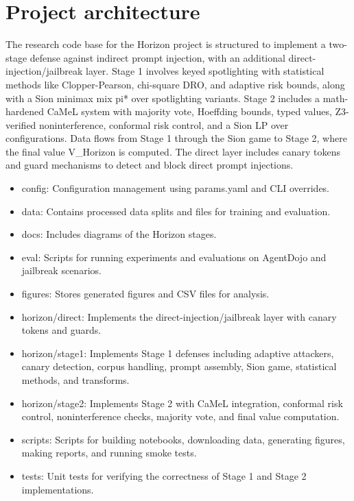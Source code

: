 \documentclass[11pt,a4paper]{article}
\begin{document}
\section{Project architecture}
The research code base for the Horizon project is structured to implement a two-stage defense against indirect prompt injection, with an additional direct-injection/jailbreak layer. Stage 1 involves keyed spotlighting with statistical methods like Clopper-Pearson, chi-square DRO, and adaptive risk bounds, along with a Sion minimax mix pi* over spotlighting variants. Stage 2 includes a math-hardened CaMeL system with majority vote, Hoeffding bounds, typed values, Z3-verified noninterference, conformal risk control, and a Sion LP over configurations. Data flows from Stage 1 through the Sion game to Stage 2, where the final value V\_Horizon is computed. The direct layer includes canary tokens and guard mechanisms to detect and block direct prompt injections.
\begin{itemize}
\item config: Configuration management using params.yaml and CLI overrides.
\item data: Contains processed data splits and files for training and evaluation.
\item docs: Includes diagrams of the Horizon stages.
\item eval: Scripts for running experiments and evaluations on AgentDojo and jailbreak scenarios.
\item figures: Stores generated figures and CSV files for analysis.
\item horizon/direct: Implements the direct-injection/jailbreak layer with canary tokens and guards.
\item horizon/stage1: Implements Stage 1 defenses including adaptive attackers, canary detection, corpus handling, prompt assembly, Sion game, statistical methods, and transforms.
\item horizon/stage2: Implements Stage 2 with CaMeL integration, conformal risk control, noninterference checks, majority vote, and final value computation.
\item scripts: Scripts for building notebooks, downloading data, generating figures, making reports, and running smoke tests.
\item tests: Unit tests for verifying the correctness of Stage 1 and Stage 2 implementations.
\end{itemize}
\end{document}
